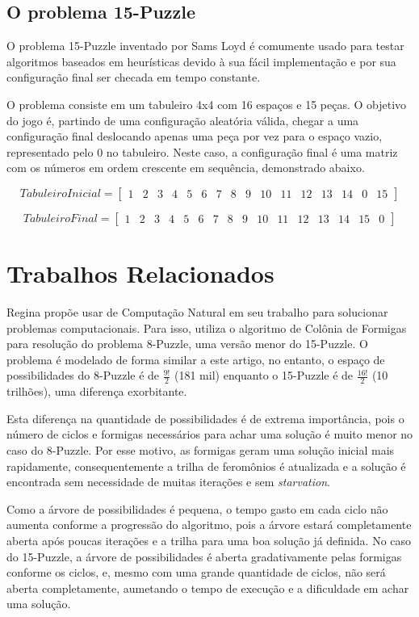 \documentclass[12pt]{article}
\begin{document}
\subsection{O problema 15-Puzzle}
O problema 15-Puzzle inventado por Sams Loyd é comumente usado para testar algoritmos baseados em heurísticas devido à sua fácil implementação e por sua configuração final ser checada em tempo constante. 

O problema consiste em um tabuleiro 4x4 com 16 espaços e 15 peças. O objetivo do jogo é, partindo de uma configuração aleatória válida, chegar a uma configuração final deslocando apenas uma peça por vez para o espaço vazio, representado pelo 0 no tabuleiro. Neste caso, a configuração final é uma matriz com os números em ordem crescente em sequência, demonstrado abaixo.

\[Tabuleiro Inicial= \left[ 
    {\begin{array}{cccc}
        1 & 2 & 3 & 4 & 5 & 6 & 7 & 8 & 9 & 10 & 11 & 12 & 13 & 14 & 0 & 15
    \end{array} } \right]
\]

\[Tabuleiro Final= \left[ 
    {\begin{array}{cccc}
        1 & 2 & 3 & 4 & 5 & 6 & 7 & 8 & 9 & 10 & 11 & 12 & 13 & 14 & 15 & 0
    \end{array} } \right]
\]


\section{Trabalhos Relacionados}

Regina propõe usar de Computação Natural em seu trabalho \cite{Rose8puzzle} para solucionar problemas computacionais. Para isso, utiliza o algoritmo de Colônia de Formigas para resolução do problema 8-Puzzle, uma versão menor do 15-Puzzle. O problema é modelado de forma similar a este artigo, no entanto, o espaço de possibilidades do 8-Puzzle é de $\frac{9!}{2}$ (181 mil) enquanto o 15-Puzzle é de $\frac{16!}{2}$ (10 trilh\~oes), uma diferença exorbitante.

Esta diferença na quantidade de possibilidades é de extrema importância, pois o número de ciclos e formigas necessários para achar uma solução é muito menor no caso do 8-Puzzle. Por esse motivo, as formigas geram uma solução inicial mais rapidamente, consequentemente a trilha de feromônios é atualizada e a solução é encontrada sem necessidade de muitas iterações e sem \textit{starvation}.

Como a árvore de possibilidades é pequena, o tempo gasto em cada ciclo não aumenta conforme a progressão do algoritmo, pois a árvore estará completamente aberta após poucas iterações e a trilha para uma boa solução já definida. No caso do 15-Puzzle, a árvore de possibilidades é aberta gradativamente pelas formigas conforme os ciclos, e, mesmo com uma grande quantidade de ciclos, não será aberta completamente, aumetando o tempo de execução e a dificuldade em achar uma solução.
\end{document}
